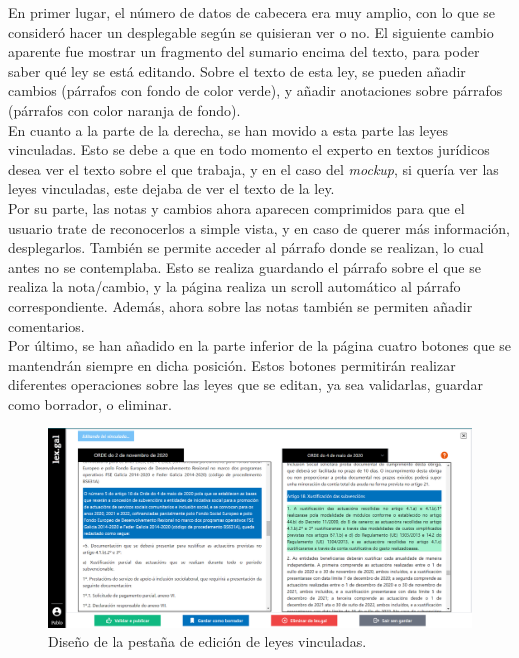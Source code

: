 En primer lugar, el número de datos de cabecera era muy amplio, con lo que se consideró hacer un desplegable según se quisieran ver o no. El siguiente cambio aparente fue mostrar un fragmento del sumario encima del texto, para poder saber qué ley se está editando. Sobre el texto de esta ley, se pueden añadir cambios (párrafos con fondo de color verde), y añadir anotaciones sobre párrafos (párrafos con color naranja de fondo).
\\

En cuanto a la parte de la derecha, se han movido a esta parte las leyes vinculadas. Esto se debe a que en todo momento el experto en textos jurídicos desea ver el texto sobre el que trabaja, y en el caso del {\it mockup}, si quería ver las leyes vinculadas, este dejaba de ver el texto de la ley. 
\\

Por su parte, las notas y cambios ahora aparecen comprimidos para que el usuario trate de reconocerlos a simple vista, y en caso de querer más información, desplegarlos. También se permite acceder al párrafo donde se realizan, lo cual antes no se contemplaba. Esto se realiza guardando el párrafo sobre el que se realiza la nota/cambio, y la página realiza un scroll automático al párrafo correspondiente. Además, ahora sobre las notas también se permiten añadir comentarios.
\\

Por último, se han añadido en la parte inferior de la página cuatro botones que se mantendrán siempre en dicha posición. Estos botones permitirán realizar diferentes operaciones sobre las leyes que se editan, ya sea validarlas, guardar como borrador, o eliminar.

\begin{figure}[H]
\centerline{\includegraphics[width=13cm]{figuras/manualUsuario/PestanaLeyVinculada.PNG}}
\caption{Diseño de la pestaña de edición de leyes vinculadas.}
\label{enlacePLeyVinculadaDiseno}
\end{figure}

